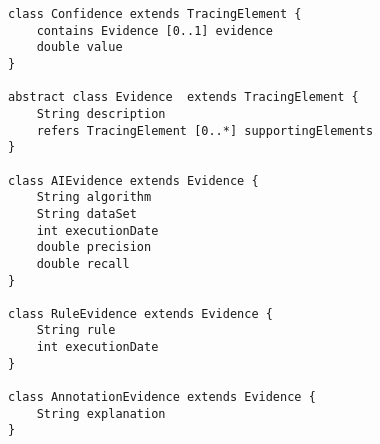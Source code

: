 
\begin{lstlisting}[caption={Confidence and evidences for trustable traceability},label=lst:quality,style=mystylexcore,frame=shadowbox, rulesepcolor=\color{blue}]
class Confidence extends TracingElement {
	contains Evidence [0..1] evidence
	double value 
}

abstract class Evidence  extends TracingElement {
	String description
	refers TracingElement [0..*] supportingElements 
}

class AIEvidence extends Evidence {
	String algorithm
	String dataSet
	int executionDate
	double precision
	double recall 
}

class RuleEvidence extends Evidence {
	String rule
	int executionDate 
}

class AnnotationEvidence extends Evidence {
	String explanation 
}
\end{lstlisting}




